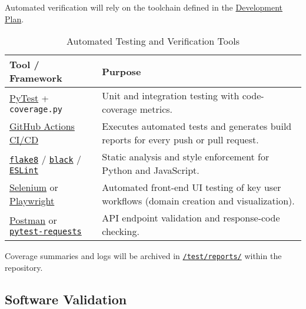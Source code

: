 \documentclass[12pt, titlepage]{article}
\renewcommand{\arraystretch}{1.15}
\begin{document}

Automated verification will rely on the toolchain defined in the \href{https://github.com/thaafei/DomainX/blob/main/docs/DevelopmentPlan/DevelopmentPlan.pdf}{Development
Plan}.

\begin{table}[H]
\centering
\caption{Automated Testing and Verification Tools}
\setlength{\tabcolsep}{6pt}
\renewcommand{\arraystretch}{1.2}
\footnotesize

\begin{tabularx}{\textwidth}{l X}
\toprule
\textbf{Tool / Framework} & \textbf{Purpose} \\
\midrule
\arrayrulecolor[gray]{0.8}
\href{https://docs.pytest.org/en/stable/}{PyTest} + \texttt{coverage.py} &
Unit and integration testing with code-coverage metrics. \\
\hline
\href{https://github.com/thaafei/DomainX/actions}{GitHub Actions CI/CD} &
Executes automated tests and generates build reports for every push or pull
request. \\
\hline
\texttt{\href{https://flake8.pycqa.org/en/latest/}{flake8}} / \texttt{\href{https://github.com/psf/black}{black}} / \texttt{\href{https://eslint.org/}{ESLint}} &
Static analysis and style enforcement for Python and JavaScript. \\
\hline
\href{https://www.selenium.dev/}{Selenium} or \href{https://playwright.dev/}{Playwright} &
Automated front-end UI testing of key user workflows (domain creation and visualization). \\
\hline
\href{https://www.postman.com/}{Postman} or \texttt{\href{https://requests-mock.readthedocs.io/en/latest/pytest.html}{pytest-requests}} &
API endpoint validation and response-code checking. \\
\bottomrule
\end{tabularx}
\end{table}

Coverage summaries and logs will be archived in \texttt{\href{https://github.com/thaafei/DomainX/tree/main/test}{/test/reports/}} within
the repository.

\subsection{Software Validation}
\label{subsec:software-validation}
\end{document}
